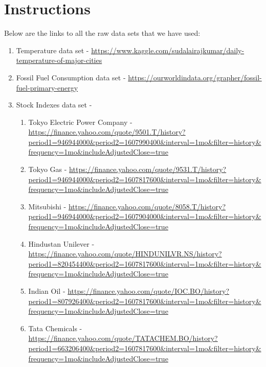 \documentclass[fontsize=11pt]{article}
\begin{document}
\section*{Instructions}

Below are the links to all the raw data sets that we have used:

\begin{enumerate}

    \item
    Temperature data set - \href{https://www.kaggle.com/sudalairajkumar/daily-temperature-of-major-cities}{https://www.kaggle.com/sudalairajkumar/daily-temperature-of-major-cities}\par

    \item Fossil Fuel Consumption data set - \url{https://ourworldindata.org/grapher/fossil-fuel-primary-energy}\par

\item Stock Indexes data set -
\begin{enumerate}
    \item Tokyo Electric Power Company - \url{https://finance.yahoo.com/quote/9501.T/history?period1=946944000&period2=1607990400&interval=1mo&filter=history&frequency=1mo&includeAdjustedClose=true}\par

    \item Tokyo Gas - \url{https://finance.yahoo.com/quote/9531.T/history?period1=946944000\&period2=1607817600\&interval=1mo\&filter=history\&frequency=1mo\&includeAdjustedClose=true}\par

    \item
    Mitsubishi - \url{https://finance.yahoo.com/quote/8058.T/history?period1=946944000&period2=1607904000&interval=1mo&filter=history&frequency=1mo&includeAdjustedClose=true}\par

    \item Hindustan Unilever - \url{https://finance.yahoo.com/quote/HINDUNILVR.NS/history?period1=820454400\&period2=1607817600\&interval=1mo\&filter=history\&frequency=1mo\&includeAdjustedClose=true}\par

    \item
    Indian Oil - \url{https://finance.yahoo.com/quote/IOC.BO/history?period1=807926400\&period2=1607817600\&interval=1mo\&filter=history\&frequency=1mo\&includeAdjustedClose=true}\par

    \item
    Tata Chemicals - \url{https://finance.yahoo.com/quote/TATACHEM.BO/history?period1=663206400\&period2=1607817600\&interval=1mo\&filter=history\&frequency=1mo\&includeAdjustedClose=true}\par

\end{enumerate}
\end{enumerate}
\end{document}
